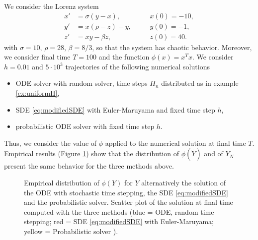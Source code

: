 \documentclass{scrartcl}
\begin{document}
We consider the Lorenz system 
\begin{equation}\label{eq:Lorenz}
\begin{aligned}
x' &= \sigma(y - x), \quad &&x(0) = -10,\\
y' &= x(\rho - z) - y, \quad &&y(0) = -1,\\
z' &= xy - \beta z, \quad &&z(0) = 40.
\end{aligned}
\end{equation}
with $\sigma = 10$, $\rho = 28$, $\beta = 8/3$, so that the system has chaotic behavior. Moreover, we consider final time $T = 100$ and the function $\phi(x) = x^Tx$. We consider $h = 0.01$ and $5\cdot 10^3$ trajectories of the following numerical solutions
\begin{itemize}
	\item ODE solver with random solver, time steps $H_n$ distributed as in example \ref{ex:uniformH},
	\item SDE \eqref{eq:modifiedSDE} with Euler-Maruyama and fixed time step $h$,
	\item probabilistic ODE solver \cite{CGS16} with fixed time step $h$.
\end{itemize}  
Thus, we consider the value of $\phi$ applied to the numerical solution at final time $T$. Empirical results (Figure \ref{fig:distributionPhi}) show that the distribution of $\phi(\tilde Y)$ and of $Y_N$ present the same behavior for the three methods above.

\begin{figure}[t]
	\begin{subfigure}{0.49\linewidth}
		\centering
		\resizebox{1.0\linewidth}{!}{}
	\end{subfigure}
	\begin{subfigure}{0.49\linewidth}
		\centering
		\resizebox{1.0\linewidth}{!}{}
	\end{subfigure}
	\begin{subfigure}{0.49\linewidth}
		\centering
		\resizebox{1.0\linewidth}{!}{}
	\end{subfigure}
	\begin{subfigure}{0.49\linewidth}
		\centering
		\resizebox{1.0\linewidth}{!}{}
	\end{subfigure}
	\caption{Empirical distribution of $\phi(Y)$ for $Y$ alternatively the solution of the ODE with stochastic time stepping, the SDE \eqref{eq:modifiedSDE} and the probabilistic solver. Scatter plot of the solution at final time computed with the three methods (blue = ODE, random time stepping; red = SDE \eqref{eq:modifiedSDE} with Euler-Maruyama; yellow = Probabilistic solver \cite{CGS16}).}
	\label{fig:distributionPhi}
\end{figure}




\end{document}
